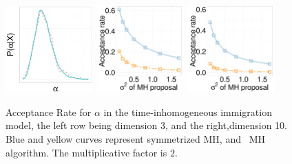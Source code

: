 
  \begin{figure}[H]
  \centering

  \begin{minipage}[!hp]{0.99\linewidth}
    \includegraphics [width=0.3\textwidth, angle=0]{figs/QC_ks/qc_hist_4_03_10_.pdf}
	\hspace{.5in}
    \includegraphics [width=0.30\textwidth, angle=0]{figs/acc/CQ_D3alpha_k2.pdf}
    \includegraphics [width=0.30\textwidth, angle=0]{figs/acc/CQ_D10alpha_k2.pdf}
  \end{minipage}
    \caption{Acceptance Rate for $\alpha$ in the time-inhomogeneous immigration model, the left row being dimension 3, and the right,dimension 10.  Blue and yellow curves represent symmetrized MH,
 and \naive\ MH  algorithm. The multiplicative factor is $2$. }
     \label{fig:ACC_CQ}
  \end{figure}

